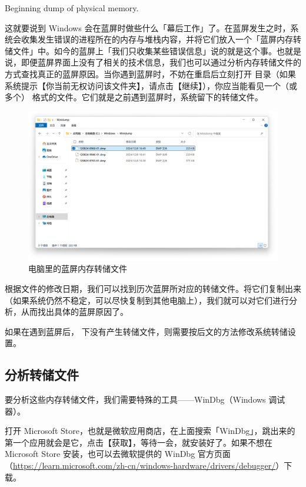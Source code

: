 \begin{quoting}
  Beginning dump of physical memory.
\end{quoting}

这就要说到 Windows 会在蓝屏时做些什么「幕后工作」了。在蓝屏发生之时，系统会收集发生错误的进程所在的内存与堆栈内容，并将它们放入一个「蓝屏内存转储文件」中。如今的蓝屏上「我们只收集某些错误信息」说的就是这个事。也就是说，即便蓝屏界面上没有了相关的技术信息，我们也可以通过分析内存转储文件的方式查找真正的蓝屏原因。当你遇到蓝屏时，不妨在重启后立刻打开  目录（如果系统提示【你当前无权访问该文件夹】，请点击【继续】），你应当能看见一个（或多个） 格式的文件。它们就是之前遇到蓝屏时，系统留下的转储文件。

\begin{figure}[htb!]
  \centering
  \includegraphics[width=.75\textwidth]{assets/advanced/Dump_files.png}
  \caption{电脑里的蓝屏内存转储文件}
  \label{fig:Dump_files}
\end{figure}

根据文件的修改日期，我们可以找到历次蓝屏所对应的转储文件。将它们复制出来（如果系统仍然不稳定，可以尽快复制到其他电脑上），我们就可以对它们进行分析，从而找出具体的蓝屏原因了。

\begin{note}
  如果在遇到蓝屏后， 下没有产生转储文件，则需要按后文的方法修改系统转储设置。
\end{note}

\subsection{分析转储文件}

要分析这些内存转储文件，我们需要特殊的工具——WinDbg（Windows 调试器）。

打开 Microsoft Store，也就是微软应用商店，在上面搜索「WinDbg」，跳出来的第一个应用就会是它，点击【获取】，等待一会，就安装好了。如果不想在 Microsoft Store 安装，也可以去微软提供的 WinDbg 官方页面（\url{https://learn.microsoft.com/zh-cn/windows-hardware/drivers/debugger/}）下载。

